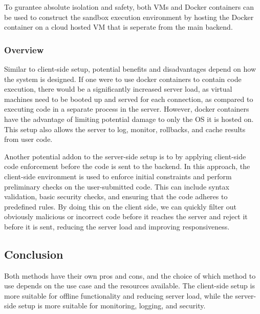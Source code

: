 To gurantee absolute isolation and safety, both VMs and Docker containers can be used to construct the sandbox execution environment by hosting the Docker container on a cloud hosted VM that is seperate from the main backend.

\subsubsection{Overview}
Similar to client-side setup, potential benefits and disadvantages depend on how the system is designed. If one were to use docker containers to contain code execution, there would be a significantly increased server load, as virtual machines need to be booted up and served for each connection, as compared to executing code in a separate process in the server. However, docker containers have the advantage of limiting potential damage to only the OS it is hosted on. This setup also allows the server to log, monitor, rollbacks, and cache results from user code.

Another potential addon to the server-side setup is to by applying client-side code enforcement before the code is sent to the backend. In this approach, the client-side environment is used to enforce initial constraints and perform preliminary checks on the user-submitted code. This can include syntax validation, basic security checks, and ensuring that the code adheres to predefined rules. By doing this on the client side, we can quickly filter out obviously malicious or incorrect code before it reaches the server and reject it before it is sent, reducing the server load and improving responsiveness.

\subsection{Conclusion}
Both methods have their own pros and cons, and the choice of which method to use depends on the use case and the resources available. The client-side setup is more suitable for offline functionality and reducing server load, while the server-side setup is more suitable for monitoring, logging, and security.

